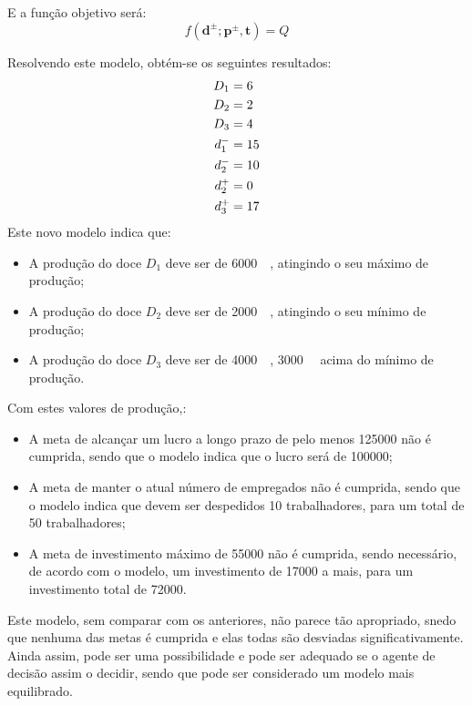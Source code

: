 E a função objetivo será:
$$
f\left(\mathbold{d^\pm}; \mathbold{p^\pm}, \mathbold{t}\right) = Q
$$

Resolvendo este modelo, obtém-se os seguintes resultados:
\begin{align*}
  D_1  &=       6     \\
  D_2  &=       2     \\
  D_3  &=       4     \\
  d_{1}^{-} &=       15    \\
  d_{2}^{-} &=       10    \\
  d_{2}^{+} &=       0     \\
  d_{3}^{+} &=       17    \\
\end{align*}
Este novo modelo indica que:
\begin{itemize}
  \item A produção do doce $D_1$ deve ser de \qty{6000}{\kilo\grams}, atingindo o seu máximo de produção;
  \item A produção do doce $D_2$ deve ser de \qty{2000}{\kilo\grams}, atingindo o seu mínimo de produção;
  \item A produção do doce $D_3$ deve ser de \qty{4000}{\kilo\grams}, \qty{3000}{\kilo\grams} acima do mínimo de produção.
\end{itemize}

Com estes valores de produção,:

\begin{itemize}
  \item A meta de alcançar um lucro a longo prazo de pelo menos \qty{125000}{\geneuro} não é cumprida, sendo que o modelo indica que o lucro será de \qty{100000}{\geneuro};
  \item A meta de manter o atual número de empregados não é cumprida, sendo que o modelo indica que devem ser despedidos 10 trabalhadores, para um total de 50 trabalhadores;
  \item A meta de investimento máximo de \qty{55000}{\geneuro} não é cumprida, sendo necessário, de acordo com o modelo, um investimento de \qty{17000}{\geneuro} a mais, para um investimento total de \qty{72000}{\geneuro}.
\end{itemize}


Este modelo, sem comparar com os anteriores, não parece tão apropriado, snedo que nenhuma das metas é cumprida e elas todas são desviadas significativamente. Ainda assim, pode ser uma possibilidade e pode ser adequado se o agente de decisão assim o decidir, sendo que pode ser considerado um modelo mais equilibrado.

